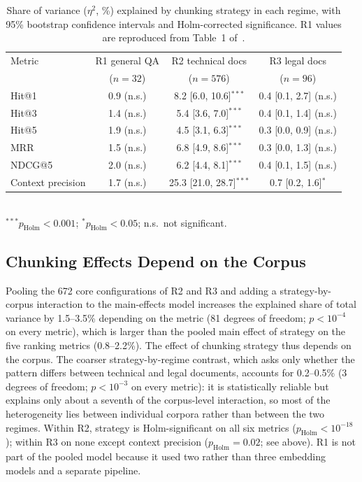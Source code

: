 \documentclass[runningheads]{llncs}
\begin{document}
\begin{table}[t]
\caption{Share of variance ($\eta^2$, \%) explained by chunking strategy in each regime, with 95\% bootstrap confidence intervals and Holm-corrected significance. R1 values are reproduced from Table~1 of~\cite{chauhan2026chunking}.}
\label{tab:regimes}
\centering
\small
\setlength{\tabcolsep}{4pt}
\begin{tabular}{lccc}
\toprule
Metric & R1 general QA & R2 technical docs & R3 legal docs \\
 & ($n=32$) & ($n=576$) & ($n=96$) \\
\midrule
Hit@1 & 0.9 (n.s.) & 8.2 [6.0, 10.6]$^{***}$ & 0.4 [0.1, 2.7] (n.s.) \\
Hit@3 & 1.4 (n.s.) & 5.4 [3.6, 7.0]$^{***}$ & 0.4 [0.1, 1.4] (n.s.) \\
Hit@5 & 1.9 (n.s.) & 4.5 [3.1, 6.3]$^{***}$ & 0.3 [0.0, 0.9] (n.s.) \\
MRR & 1.5 (n.s.) & 6.8 [4.9, 8.6]$^{***}$ & 0.3 [0.0, 1.3] (n.s.) \\
NDCG@5 & 2.0 (n.s.) & 6.2 [4.4, 8.1]$^{***}$ & 0.4 [0.1, 1.5] (n.s.) \\
Context precision & 1.7 (n.s.) & 25.3 [21.0, 28.7]$^{***}$ & 0.7 [0.2, 1.6]$^{*}$ \\
\bottomrule
\end{tabular}
\\[2pt]{\footnotesize $^{***}p_{\mathrm{Holm}}<0.001$; $^{*}p_{\mathrm{Holm}}<0.05$; n.s.\ not significant.}
\end{table}


\subsection{Chunking Effects Depend on the Corpus}
\label{sec:interaction}
Pooling the 672 core configurations of R2 and R3 and adding a strategy-by-corpus interaction to the main-effects model increases the explained share of total variance by 1.5--3.5\% depending on the metric (81 degrees of freedom; $p<10^{-4}$ on every metric), which is larger than the pooled main effect of strategy on the five ranking metrics (0.8--2.2\%). The effect of chunking strategy thus depends on the corpus. The coarser strategy-by-regime contrast, which asks only whether the pattern differs between technical and legal documents, accounts for 0.2--0.5\% (3 degrees of freedom; $p<10^{-3}$ on every metric): it is statistically reliable but explains only about a seventh of the corpus-level interaction, so most of the heterogeneity lies between individual corpora rather than between the two regimes. Within R2, strategy is Holm-significant on all six metrics ($p_{\mathrm{Holm}}<10^{-18}$); within R3 on none except context precision ($p_{\mathrm{Holm}}=0.02$; see above). R1 is not part of the pooled model because it used two rather than three embedding models and a separate pipeline.
\end{document}
